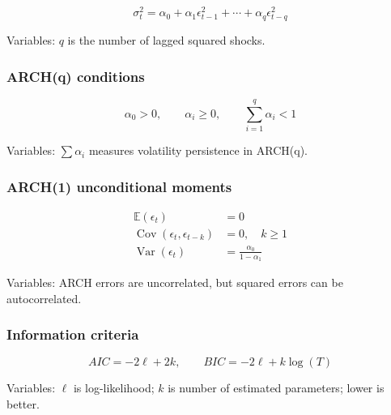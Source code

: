 \documentclass[
  8pt,
  twocolumn]{extarticle}
\begin{document}
\[
\sigma_t^2=\alpha_0+\alpha_1\epsilon_{t-1}^2+\cdots+\alpha_q\epsilon_{t-q}^2
\]

Variables: \(q\) is the number of lagged squared shocks.

\subsubsection{ARCH(q) conditions}\label{archq-conditions}

\[
\alpha_0>0,\qquad \alpha_i\ge0,\qquad \sum_{i=1}^{q}\alpha_i<1
\]

Variables: \(\sum\alpha_i\) measures volatility persistence in ARCH(q).

\subsubsection{ARCH(1) unconditional
moments}\label{arch1-unconditional-moments}

\[
\begin{aligned}
\mathbb E(\epsilon_t)&=0\\
\operatorname{Cov}(\epsilon_t,\epsilon_{t-k})&=0,\quad k\ge1\\
\operatorname{Var}(\epsilon_t)&=\frac{\alpha_0}{1-\alpha_1}
\end{aligned}
\]

Variables: ARCH errors are uncorrelated, but squared errors can be
autocorrelated.

\subsubsection{Information criteria}\label{information-criteria}

\[
AIC=-2\ell+2k,\qquad BIC=-2\ell+k\log(T)
\]

Variables: \(\ell\) is log-likelihood; \(k\) is number of estimated
parameters; lower is better.
\end{document}
